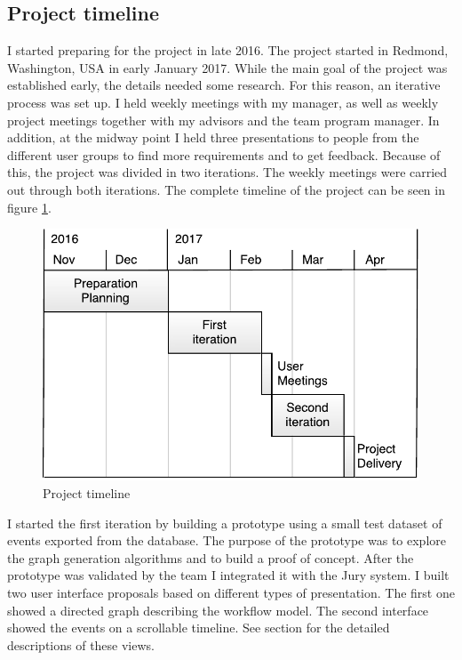 \subsection{Project timeline}
\label{sec:timeline}
I started preparing for the project in late 2016.
The project started in Redmond, Washington, USA in early January 2017.
While the main goal of the project was established early, the details needed some research. 
For this reason, an iterative process was set up.
I held weekly meetings with my manager, as well as weekly project meetings together with my advisors and the team program manager. 
In addition, at the midway point I held three presentations to people from the different user groups to find more requirements and to get feedback. Because of this, the project was divided in two iterations.
The weekly meetings were carried out through both iterations.
The complete timeline of the project can be seen in figure \ref{fig:projecttimeline}.

\begin{figure}[htb]
\centering \includegraphics[width=0.7\linewidth]{gfx/figures/projecttimeline.pdf}
\caption{Project timeline}
\label{fig:projecttimeline}
\end{figure}

I started the first iteration by building a prototype using a small test dataset of events exported from the database. The purpose of the prototype was to explore the graph generation algorithms and to build a proof of concept. 
After the prototype was validated by the team I integrated it with the Jury system. 
I built two user interface proposals based on different types of presentation. The first one showed a directed graph describing the workflow model. The second interface showed the events on a scrollable timeline.
See section  for the detailed descriptions of these views.

